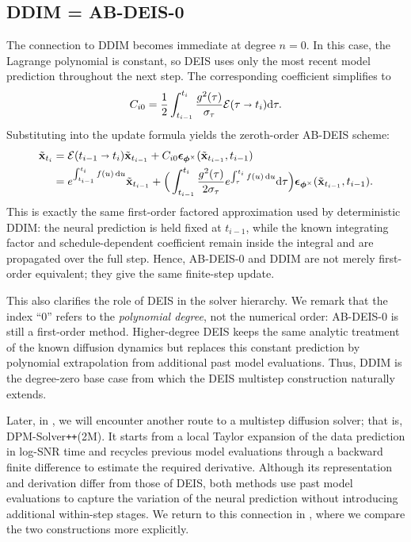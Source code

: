 \subsection{DDIM = AB-DEIS-0}
\label{sec:ddim-deis}

The connection to DDIM becomes immediate at degree $n=0$. In this case, the
Lagrange polynomial is constant, so DEIS uses only the most recent model
prediction throughout the next step. The corresponding coefficient simplifies
to
\[
C_{i0} = \frac{1}{2} \int_{t_{i-1}}^{t_{i}} \frac{g^2(\tau)}{\sigma_\tau} \mathcal{E}(\tau \shortrightarrow t_i)   \mathrm{d}\tau.
\]
Substituting into the update formula yields the zeroth-order AB-DEIS scheme:
\begin{align}\label{eq:deis-0}
  \tilde{{\mathbf{x}}}_{t_{i}} &=  \mathcal{E}(t_{i-1} \shortrightarrow t_{i})\tilde{{\mathbf{x}}}_{t_{i-1}} + C_{i0} \bm{\epsilon}_{\bm{\phi}^\times}(\tilde{{\mathbf{x}}}_{t_{i-1}}, t_{i-1})\nonumber\\
  &=e^{\int_{t_{i-1}}^{t_{i}}f(u)\mathop{}\!\mathrm{d} u} \tilde{{\mathbf{x}}}_{t_{i-1}} + \Big( \int_{t_{i-1}}^{t_{i}} \frac{g^2(\tau)}{2\sigma_\tau} e^{\int_{\tau}^{t_{i}}f(u)\mathop{}\!\mathrm{d} u}   \mathrm{d}\tau
\Big) \bm{\epsilon}_{\bm{\phi}^\times}(\tilde{{\mathbf{x}}}_{t_{i-1}}, t_{i-1}).  
\end{align}
This is exactly the same first-order factored approximation used by
deterministic DDIM: the neural prediction is held fixed at
$t_{i-1}$, while the known integrating factor and schedule-dependent
coefficient remain inside the integral and are propagated over the full step.
Hence, AB-DEIS-0 and DDIM are not merely first-order equivalent; they give
the same finite-step update.


This also clarifies the role of DEIS in the solver hierarchy. We remark that the index
``$0$'' refers to the \emph{polynomial degree}, not the numerical order:
AB-DEIS-0 is still a first-order method. Higher-degree DEIS keeps the same
analytic treatment of the known diffusion dynamics but replaces this constant
prediction by polynomial extrapolation from additional past model evaluations.
Thus, DDIM is the degree-zero base case from which the DEIS multistep
construction naturally extends.

Later, in , we will encounter another route to
a multistep diffusion solver; that is, DPM-Solver\texttt{++}(2M). It starts from a local
Taylor expansion of the data prediction in log-SNR time and recycles previous
model evaluations through a backward finite difference to estimate the required
derivative. Although its representation and derivation differ from those of
DEIS, both methods use past model evaluations to capture the variation of the
neural prediction without introducing additional within-step stages. We return
to this connection in , where we compare the two
constructions more explicitly.
    
